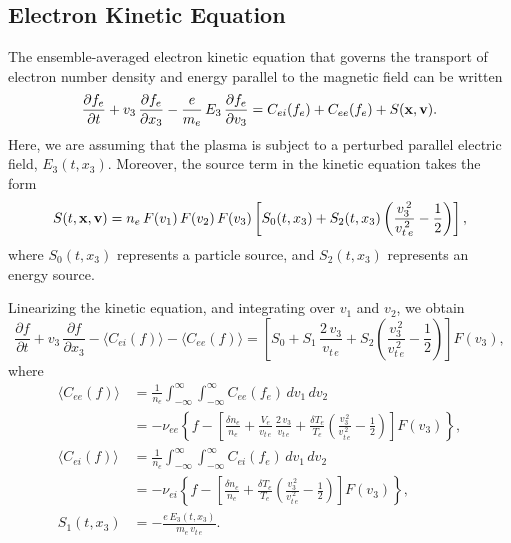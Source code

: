 \documentclass[12pt,prb,aps]{revtex4-1}
\begin{document}
\subsection{Electron Kinetic Equation}
The  ensemble-averaged electron kinetic equation that governs the transport of electron number density
and energy parallel to the magnetic field can be written\,\cite{haz,rf0}
\begin{equation}
\frac{\partial f_e}{\partial t}+v_3\,\frac{\partial f_e}{\partial x_3} -\frac{e}{m_e}\,E_3\,\frac{\partial f_e}{\partial v_3} = C_{ei}(f_e) + C_{ee}(f_e) + S({\bf x},{\bf v}).
\end{equation}
Here, we are assuming that the plasma is subject to a perturbed parallel electric
field, $E_3(t,x_3)$. Moreover, the source term in the kinetic equation takes the form 
\begin{equation}
S(t,{\bf x},{\bf v}) = n_e\,F(v_1)\,F(v_2)\,F(v_3)\left[S_0(t,x_3) +S_2(t,x_3)\left(\frac{v_3^{\,2}}{v_{t\,e}^{\,2}}-\frac{1}{2}\right) \right],
\end{equation}
where $S_0(t,x_3)$ represents a particle source, and $S_2(t,x_3)$ represents an energy source. 

Linearizing the kinetic equation, and integrating over $v_1$ and $v_2$, we obtain
\begin{equation}\label{e40}
\frac{\partial f}{\partial t}+v_3\,\frac{\partial f}{\partial x_3} - \langle C_{ei}( f)\rangle- \langle C_{ee}(f)\rangle = \left[
S_0 +S_1\,\frac{2\,v_3}{v_{t\,e}} +S_2 \left(\frac{v_3^{\,2}}{v_{t\,e}^{\,2}}-\frac{1}{2}\right)\right]F(v_3),
\end{equation}
where
\begin{align}\label{cee}
\langle C_{ee}(f)\rangle&= \frac{1}{n_e}\int_{-\infty}^\infty\!\int_{-\infty}^\infty C_{ee}(f_e)\,dv_1\,dv_2\nonumber\\[0.5ex]&= -\nu_{ee}\left\{f-\left[\frac{\delta n_e}{n_e}+\frac{ V_e}{v_{t\,e}}\,\frac{2\,v_3}{v_{t\,e}}
+\frac{\delta T_e}{T_e}\left(\frac{v_3^{\,2}}{v_{t\,e}^{\,2}}-\frac{1}{2}\right)\right]F(v_3)\right\},\\[0.5ex]
\langle C_{ei}(f)\rangle&= \frac{1}{n_e}\int_{-\infty}^\infty\!\int_{-\infty}^\infty C_{ei}(f_e)\,dv_1\,dv_2\nonumber\\[0.5ex]&=-\nu_{ei}\left\{f-\left[\frac{\delta n_e}{n_e}
+\frac{\delta T_e}{T_e}\left(\frac{v_3^{\,2}}{v_{t\,e}^{\,2}}-\frac{1}{2}\right)\right]F(v_3)\right\},\label{cei}\\[0.5ex]
S_1(t,x_3) &= - \frac{e\, E_3(t,x_3)}{m_e\,v_{t\,e}}.\label{s1}
\end{align}
\end{document}
